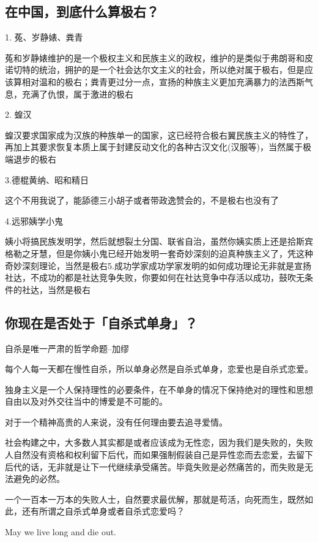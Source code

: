 \documentclass{ctexart}
\begin{document}
	\subsection{在中国，到底什么算极右？}
	
	1. 菟、岁静婊、粪青
	
	菟和岁静婊维护的是一个极权主义和民族主义的政权，维护的是类似于弗朗哥和皮诺切特的统治，拥护的是一个社会达尔文主义的社会，所以绝对属于极右，但是应该算相对温和的极右；粪青更过分一点，宣扬的种族主义更加充满暴力的法西斯气息，充满了仇恨，属于激进的极右
	
	2. 蝗汉
	
	蝗汉要求国家成为汉族的种族单一的国家，这已经符合极右翼民族主义的特性了，再加上其要求恢复本质上属于封建反动文化的各种古汉文化(汉服等)，当然属于极端退步的极右
	
	3.德棍黄纳、昭和精日
	
	这个不用我说了，能舔德三小胡子或者带政逸赞会的，不是极右也没有了
	
	4.远邪姨学小鬼
	
	姨小将搞民族发明学，然后就想裂土分国、联省自治，虽然你姨实质上还是拾斯宾格勒之牙慧，但是你姨小鬼已经开始发明一套奇妙深刻的迫真种族主义了，凭这种奇妙深刻理论，当然是极右5.成功学家成功学家发明的如何成功理论无非就是宣扬社达，不成功的都是社达竞争失败，你要如何在社达竞争中存活以成功，鼓吹无条件的社达，当然是极右
	
	\subsection{你现在是否处于「自杀式单身」？}
	
	自杀是唯一严肃的哲学命题--加缪
	
	每个人每一天都在慢性自杀，所以单身必然是自杀式单身，恋爱也是自杀式恋爱。
	
	独身主义是一个人保持理性的必要条件，在不单身的情况下保持绝对的理性和思想自由以及对外交往当中的博爱是不可能的。
	
	对于一个精神高贵的人来说，没有任何理由要去追寻爱情。
	
	社会构建之中，大多数人其实都是或者应该成为无性恋，因为我们是失败的，失败人自然没有资格和权利留下后代，而如果强制假装自己是异性恋而去恋爱，去留下后代的话，无非就是让下一代继续承受痛苦。毕竟失败是必然痛苦的，而失败是无法避免的必然。
	
	一个一百本一万本的失败人士，自然要求最优解，那就是苟活，向死而生，既然如此，还有所谓之自杀式单身或者自杀式恋爱吗？
	
	May we live long and die out.
	
\end{document}
